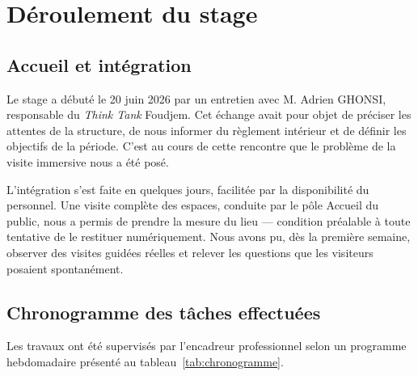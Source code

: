 \section{Déroulement du stage}
\label{sec:stage}

\subsection{Accueil et intégration}

Le stage a débuté le 20 juin 2026 par un entretien avec M. Adrien GHONSI,
responsable du \emph{Think Tank} Foudjem. Cet échange avait pour objet de
préciser les attentes de la structure, de nous informer du règlement intérieur
et de définir les objectifs de la période. C'est au cours de cette rencontre que
le problème de la visite immersive nous a été posé.

L'intégration s'est faite en quelques jours, facilitée par la disponibilité du
personnel. Une visite complète des espaces, conduite par le pôle Accueil du
public, nous a permis de prendre la mesure du lieu — condition préalable à toute
tentative de le restituer numériquement. Nous avons pu, dès la première semaine,
observer des visites guidées réelles et relever les questions que les visiteurs
posaient spontanément.

\subsection{Chronogramme des tâches effectuées}

Les travaux ont été supervisés par l'encadreur professionnel selon un programme
hebdomadaire présenté au tableau~\ref{tab:chronogramme}.

